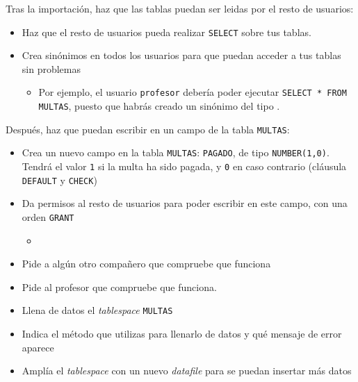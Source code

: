 \begin{homeworkProblem}
  Tras la importación, haz que las tablas puedan ser leidas por el resto de usuarios:
  \begin{itemize}
  \item Haz que el resto de usuarios pueda realizar \texttt{SELECT} sobre tus tablas.  
  \item Crea sinónimos en todos los usuarios para que puedan acceder a tus tablas sin problemas
    \begin{itemize}
    \item Por ejemplo, el usuario \texttt{profesor} debería poder ejecutar \texttt{SELECT * FROM MULTAS}, puesto que habrás creado un sinónimo del tipo .
    \end{itemize}
  \end{itemize}

  Después, haz que puedan escribir en un campo de la tabla \texttt{MULTAS}:
  \begin{itemize}
  \item Crea un nuevo campo en la tabla \texttt{MULTAS}: \texttt{PAGADO}, de tipo \texttt{NUMBER(1,0)}. Tendrá el valor \texttt{1} si la multa ha sido pagada, y \texttt{0} en caso contrario (cláusula \texttt{DEFAULT} y \texttt{CHECK})
    
  \item Da permisos al resto de usuarios para poder escribir en este campo, con una orden \texttt{GRANT}
    \begin{itemize}
    \item {}
    \end{itemize}

  \item Pide a algún otro compañero que compruebe que funciona
  \item Pide al profesor que compruebe que funciona.

  \end{itemize}
  

\end{homeworkProblem}

\begin{homeworkProblem}
  \begin{itemize}
  \item Llena de datos el \textit{tablespace} \texttt{MULTAS}
  \item Indica el método que utilizas para llenarlo de datos y qué mensaje de error aparece
  \item Amplía el \textit{tablespace}  con un nuevo \textit{datafile} para se puedan insertar más datos
  \end{itemize}
\end{homeworkProblem}


